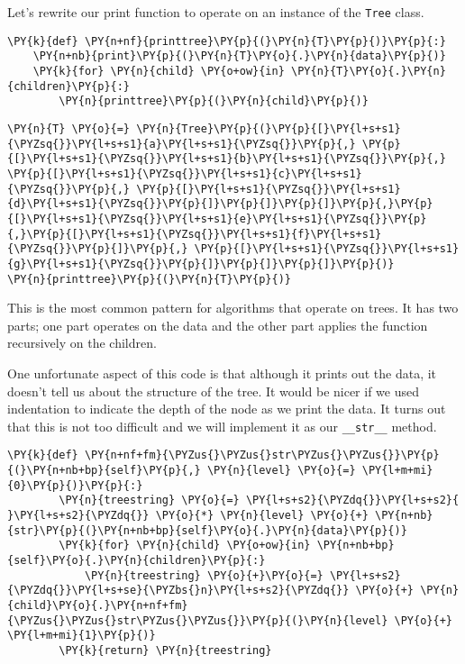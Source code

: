 Let's rewrite our print function to operate on an instance of the \texttt{Tree} class.

\begin{Verbatim}[commandchars=\\\{\}]
\PY{k}{def} \PY{n+nf}{printtree}\PY{p}{(}\PY{n}{T}\PY{p}{)}\PY{p}{:}
    \PY{n+nb}{print}\PY{p}{(}\PY{n}{T}\PY{o}{.}\PY{n}{data}\PY{p}{)}
    \PY{k}{for} \PY{n}{child} \PY{o+ow}{in} \PY{n}{T}\PY{o}{.}\PY{n}{children}\PY{p}{:}
        \PY{n}{printtree}\PY{p}{(}\PY{n}{child}\PY{p}{)}
\end{Verbatim}


\begin{Verbatim}[commandchars=\\\{\}]
\PY{n}{T} \PY{o}{=} \PY{n}{Tree}\PY{p}{(}\PY{p}{[}\PY{l+s+s1}{\PYZsq{}}\PY{l+s+s1}{a}\PY{l+s+s1}{\PYZsq{}}\PY{p}{,} \PY{p}{[}\PY{l+s+s1}{\PYZsq{}}\PY{l+s+s1}{b}\PY{l+s+s1}{\PYZsq{}}\PY{p}{,} \PY{p}{[}\PY{l+s+s1}{\PYZsq{}}\PY{l+s+s1}{c}\PY{l+s+s1}{\PYZsq{}}\PY{p}{,} \PY{p}{[}\PY{l+s+s1}{\PYZsq{}}\PY{l+s+s1}{d}\PY{l+s+s1}{\PYZsq{}}\PY{p}{]}\PY{p}{]}\PY{p}{]}\PY{p}{,}\PY{p}{[}\PY{l+s+s1}{\PYZsq{}}\PY{l+s+s1}{e}\PY{l+s+s1}{\PYZsq{}}\PY{p}{,}\PY{p}{[}\PY{l+s+s1}{\PYZsq{}}\PY{l+s+s1}{f}\PY{l+s+s1}{\PYZsq{}}\PY{p}{]}\PY{p}{,} \PY{p}{[}\PY{l+s+s1}{\PYZsq{}}\PY{l+s+s1}{g}\PY{l+s+s1}{\PYZsq{}}\PY{p}{]}\PY{p}{]}\PY{p}{]}\PY{p}{)}
\PY{n}{printtree}\PY{p}{(}\PY{n}{T}\PY{p}{)}
\end{Verbatim}



This is the most common pattern for algorithms that operate on trees.
It has two parts; one part operates on the data and the other part applies the function recursively on the children.


One unfortunate aspect of this code is that although it prints out the data, it doesn't tell us about the structure of the tree.
It would be nicer if we used indentation to indicate the depth of the node as we print the data.
It turns out that this is not too difficult and we will implement it as our \texttt{\_\_str\_\_} method.

\begin{Verbatim}[commandchars=\\\{\}]
    \PY{k}{def} \PY{n+nf+fm}{\PYZus{}\PYZus{}str\PYZus{}\PYZus{}}\PY{p}{(}\PY{n+nb+bp}{self}\PY{p}{,} \PY{n}{level} \PY{o}{=} \PY{l+m+mi}{0}\PY{p}{)}\PY{p}{:}
        \PY{n}{treestring} \PY{o}{=} \PY{l+s+s2}{\PYZdq{}}\PY{l+s+s2}{  }\PY{l+s+s2}{\PYZdq{}} \PY{o}{*} \PY{n}{level} \PY{o}{+} \PY{n+nb}{str}\PY{p}{(}\PY{n+nb+bp}{self}\PY{o}{.}\PY{n}{data}\PY{p}{)}
        \PY{k}{for} \PY{n}{child} \PY{o+ow}{in} \PY{n+nb+bp}{self}\PY{o}{.}\PY{n}{children}\PY{p}{:}
            \PY{n}{treestring} \PY{o}{+}\PY{o}{=} \PY{l+s+s2}{\PYZdq{}}\PY{l+s+se}{\PYZbs{}n}\PY{l+s+s2}{\PYZdq{}} \PY{o}{+} \PY{n}{child}\PY{o}{.}\PY{n+nf+fm}{\PYZus{}\PYZus{}str\PYZus{}\PYZus{}}\PY{p}{(}\PY{n}{level} \PY{o}{+} \PY{l+m+mi}{1}\PY{p}{)}
        \PY{k}{return} \PY{n}{treestring}
\end{Verbatim}


